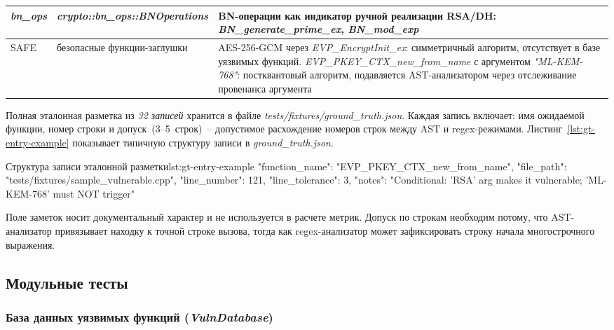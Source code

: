 \documentclass{itmo-vkr}
\newcommand{\code}[1]{\textit{#1}}
\begin{document}
\begin{longtable}{|p{2cm}|p{6cm}|p{7cm}|}
  \code{bn\_ops}
    & \code{crypto::}\allowbreak\code{bn\_ops::}\allowbreak\code{BNOperations}
    & BN-операции как индикатор ручной реализации RSA/DH:
      \code{BN\_generate\_\allowbreak prime\_ex}, \code{BN\_mod\_exp} \\ \hline

  SAFE
    & безопасные функции-заглушки
    & AES-256-GCM через \code{EVP\_EncryptInit\_ex}:
      симметричный алгоритм, отсутствует в базе уязвимых функций.
      \newline
      \code{EVP\_\allowbreak PKEY\_\allowbreak CTX\_\allowbreak new\_\allowbreak from\_name}
      с аргументом \code{"ML-KEM-768"}: постквантовый алгоритм,
      подавляется AST-анализатором через отслеживание
      провенанса аргумента \\

\end{longtable}

Полная эталонная разметка из \textit{32 записей} хранится в файле
\code{tests/\allowbreak fixtures/\allowbreak ground\_truth.json}.
Каждая запись включает: имя ожидаемой функции, номер строки и
допуск~(3--5~строк)~-- допустимое расхождение номеров строк
между AST и regex-режимами.
Листинг~\ref{lst:gt-entry-example} показывает типичную структуру
записи в \code{ground\_truth.json}.

\begin{itmolisting}[JSON]{Структура записи эталонной разметки}{lst:gt-entry-example}
{
  "function_name": "EVP_PKEY_CTX_new_from_name",
  "file_path": "tests/fixtures/sample_vulnerable.cpp",
  "line_number": 121,
  "line_tolerance": 3,
  "notes": "Conditional: 'RSA' arg makes it vulnerable; 'ML-KEM-768' must NOT trigger"
}
\end{itmolisting}

Поле заметок носит документальный характер и не используется
в расчете метрик.
Допуск по строкам необходим потому, что AST-анализатор
привязывает находку к точной строке вызова, тогда как regex-анализатор
может зафиксировать строку начала многострочного выражения.


\subsection{Модульные тесты}

\subsubsection{База данных уязвимых функций (\code{VulnDatabase})}
\end{document}
